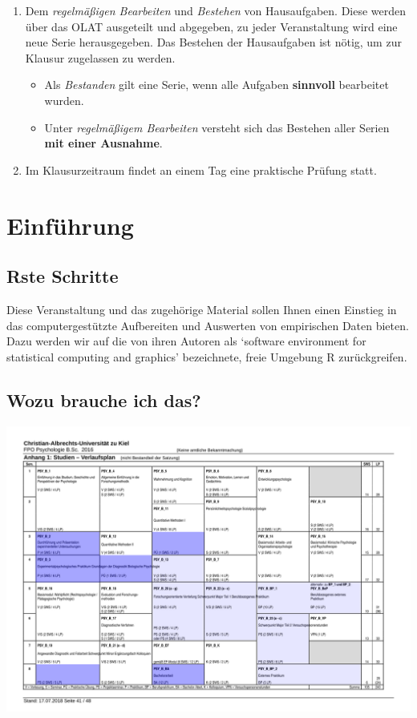 \documentclass[
]{book}
\providecommand{\tightlist}{%
  \setlength{\itemsep}{0pt}\setlength{\parskip}{0pt}}
\begin{document}
\begin{enumerate}
\def\labelenumi{\arabic{enumi}.}
\tightlist
\item
  Dem \emph{regelmäßigen Bearbeiten} und \emph{Bestehen} von Hausaufgaben. Diese werden über das OLAT ausgeteilt und abgegeben, zu jeder Veranstaltung wird eine neue Serie herausgegeben. Das Bestehen der Hausaufgaben ist nötig, um zur Klausur zugelassen zu werden.

  \begin{itemize}
  \tightlist
  \item
    Als \emph{Bestanden} gilt eine Serie, wenn alle Aufgaben \textbf{sinnvoll} bearbeitet wurden.
  \item
    Unter \emph{regelmäßigem Bearbeiten} versteht sich das Bestehen aller Serien \textbf{mit einer Ausnahme}. \medskip  
  \end{itemize}
\item
  Im Klausurzeitraum findet an einem Tag eine praktische Prüfung statt.
\end{enumerate}

\hypertarget{einfuxfchrung}{%
\section{Einführung}\label{einfuxfchrung}}

\hypertarget{rste-schritte}{%
\subsection*{Rste Schritte}\label{rste-schritte}}

Diese Veranstaltung und das zugehörige Material sollen Ihnen einen Einstieg in das computergestützte Aufbereiten und Auswerten von empirischen Daten bieten.
Dazu werden wir auf die von ihren Autoren als `software environment for statistical computing and graphics' bezeichnete, freie Umgebung R zurückgreifen.

\hypertarget{wozu-brauche-ich-das}{%
\subsection*{Wozu brauche ich das?}\label{wozu-brauche-ich-das}}

\begin{center}\includegraphics[width=0.8\linewidth]{imgs/relevanz} \end{center}
\end{document}

